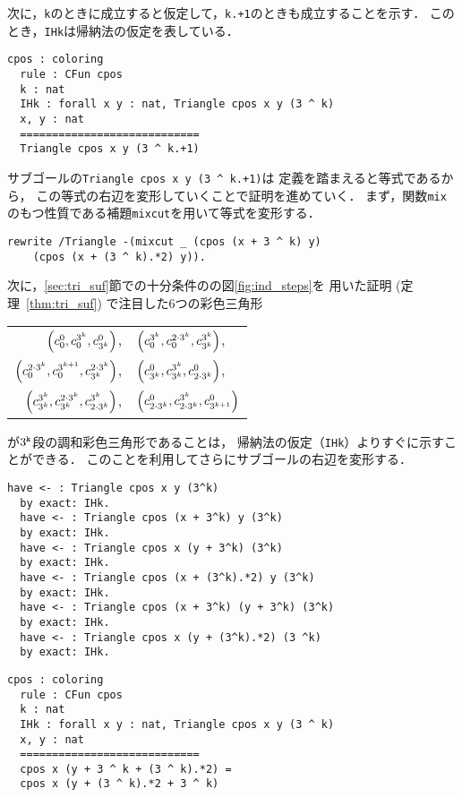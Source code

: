 次に，{\tt{k}}のときに成立すると仮定して，{\tt{k.+1}}のときも成立することを示す．
このとき，{\tt{IHk}}は帰納法の仮定を表している．
\begin{lstlisting}[language=Coq]
  cpos : coloring
  rule : CFun cpos
  k : nat
  IHk : forall x y : nat, Triangle cpos x y (3 ^ k)
  x, y : nat
  ============================
  Triangle cpos x y (3 ^ k.+1)
\end{lstlisting}
サブゴールの{\tt{Triangle cpos x y (3 \verb|^| k.+1)}}は
定義を踏まえると等式であるから，
この等式の右辺を変形していくことで証明を進めていく．
まず，関数{\tt{mix}}のもつ性質である補題{\tt{mixcut}}を用いて等式を変形する．
\begin{lstlisting}[language=Coq]
  rewrite /Triangle -(mixcut _ (cpos (x + 3 ^ k) y)
    (cpos (x + (3 ^ k).*2) y)).
\end{lstlisting}
次に，\ref{sec:tri_suf}節での十分条件のの図\ref{fig:ind_steps}を
用いた証明 (定理~\ref{thm:tri_suf}) で注目した6つの彩色三角形
\begin{center}
  \begin{tabular}{rl}
    $\left(c^{0}_{0},c^{3^{k}}_{0},c^{0}_{3^{k}}\right)$,
    &
    $\left(c^{3^{k}}_{0},c^{2\cdot3^{k}}_{0},c^{3^{k}}_{3^{k}}\right)$,
    \\
    $\left(c^{2\cdot3^{k}}_{0},c^{3^{k+1}}_{0},c^{2\cdot3^{k}}_{3^{k}}\right)$,
    &
    $\left(c^{0}_{3^{k}},c^{3^{k}}_{3^{k}},c^{0}_{2\cdot3^{k}}\right)$,
    \\
    $\left(c^{3^{k}}_{3^{k}},c^{2\cdot3^{k}}_{3^{k}},c^{3^{k}}_{2\cdot3^{k}}\right)$,
    &
    $\left(c^{0}_{2\cdot3^{k}},c^{3^{k}}_{2\cdot3^{k}},c^{0}_{3^{k+1}}\right)$
  \end{tabular}
\end{center}
が$3^{\tt{k}}$段の調和彩色三角形であることは，
帰納法の仮定（{\tt{IHk}}）よりすぐに示すことができる．
このことを利用してさらにサブゴールの右辺を変形する．
\begin{lstlisting}[language=Coq]
  have <- : Triangle cpos x y (3^k)
  by exact: IHk.
  have <- : Triangle cpos (x + 3^k) y (3^k)
  by exact: IHk.
  have <- : Triangle cpos x (y + 3^k) (3^k)
  by exact: IHk.
  have <- : Triangle cpos (x + (3^k).*2) y (3^k)
  by exact: IHk.
  have <- : Triangle cpos (x + 3^k) (y + 3^k) (3^k)
  by exact: IHk. 
  have <- : Triangle cpos x (y + (3^k).*2) (3 ^k)
  by exact: IHk.
\end{lstlisting}
\begin{lstlisting}[language=Coq]
  cpos : coloring
  rule : CFun cpos
  k : nat
  IHk : forall x y : nat, Triangle cpos x y (3 ^ k)
  x, y : nat
  ============================
  cpos x (y + 3 ^ k + (3 ^ k).*2) =
  cpos x (y + (3 ^ k).*2 + 3 ^ k)
\end{lstlisting}
